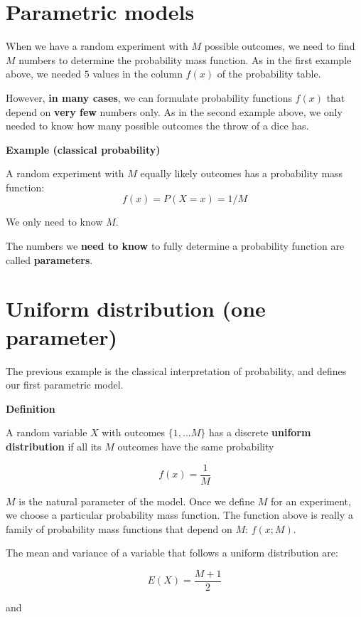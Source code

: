\documentclass[
]{book}
\begin{document}
\hypertarget{parametric-models}{%
\section{Parametric models}\label{parametric-models}}

When we have a random experiment with \(M\) possible outcomes, we need to find \(M\) numbers to determine the probability mass function. As in the first example above, we needed \(5\) values in the column \(f(x)\) of the probability table.

However, \textbf{in many cases}, we can formulate probability functions \(f(x)\) that depend on \textbf{very few} numbers only. As in the second example above, we only needed to know how many possible outcomes the throw of a dice has.

\textbf{Example (classical probability)}

A random experiment with \(M\) equally likely outcomes has a probability mass function:
\[f(x)=P(X=x)=1/M\]

We only need to know \(M\).

The numbers we \textbf{need to know} to fully determine a probability function are called \textbf{parameters}.

\hypertarget{uniform-distribution-one-parameter}{%
\section{Uniform distribution (one parameter)}\label{uniform-distribution-one-parameter}}

The previous example is the classical interpretation of probability, and defines our first parametric model.

\textbf{Definition}

A random variable \(X\) with outcomes \(\{1,...M\}\) has a discrete \textbf{uniform distribution} if all its \(M\) outcomes have the same probability

\[f(x)=\frac{1}{M}\]

\(M\) is the natural parameter of the model. Once we define \(M\) for an experiment, we choose a particular probability mass function. The function above is really a family of probability mass functions that depend on \(M\): \(f(x; M)\).

The mean and variance of a variable that follows a uniform distribution are:

\[E(X)= \frac{M+1}{2}\]

and
\end{document}
